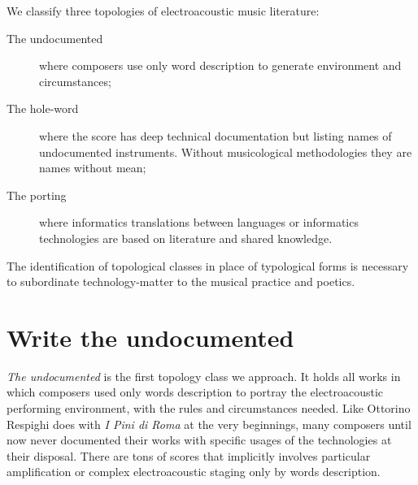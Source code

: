 \documentclass[twoside,a4paper]{article}
\begin{document}
We classify three topologies of electroacoustic music literature:

\begin{description}
  \item[The undocumented] where composers use only word description to generate environment and circumstances;
  \item[The hole-word] where the score has deep technical documentation but listing names of undocumented instruments. Without musicological methodologies they are names without mean;
  \item[The porting] where informatics translations between languages or informatics technologies are based on literature and shared knowledge.
\end{description}

The identification of topological classes in place of typological forms is necessary to subordinate technology-matter to the musical practice and poetics. %


\section{Write the undocumented}
\label{sec:writing}

\emph{The undocumented} is the first topology class we approach. It holds all works in which composers used only words description to portray the electroacoustic performing environment, with the rules and circumstances needed. Like Ottorino Respighi does with \emph{I Pini di Roma} at the very beginnings, many composers until now never documented their works with specific usages of the technologies at their disposal. There are tons of scores that implicitly involves particular amplification or complex electroacoustic staging only by words description. 

\end{document}
